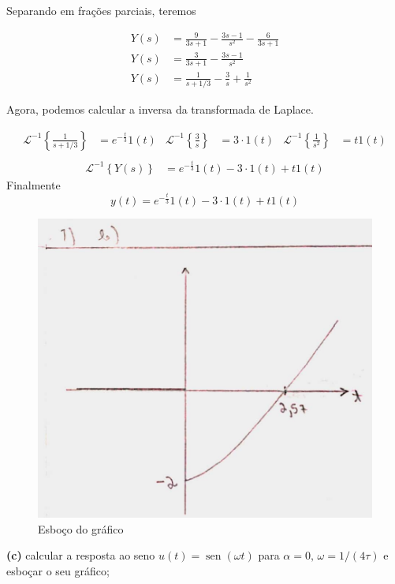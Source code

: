 \documentclass{article}
\DeclareMathOperator{\sen}{sen}
\begin{document}
Separando em frações parciais, teremos

\begin{align*}
    Y(s) &= \frac{9}{3s + 1} - \frac{3s - 1}{s^2} - \frac{6}{3s + 1}\\
    Y(s) &= \frac{3}{3s + 1} - \frac{3s - 1}{s^2}\\
    Y(s) &= \frac{1}{s + 1/3} - \frac{3}{s} + \frac{1}{s^2}
\end{align*}

Agora, podemos calcular a inversa da transformada de Laplace.

\begin{align*}
    \mathcal{L}^{-1} \left\{\frac{1}{s + 1/3}\right\} &= e^{-\frac{t}{3}}1(t) & \mathcal{L}^{-1} \left\{\frac{3}{s}\right\} &= 3\cdot1(t) & \mathcal{L}^{-1} \left\{\frac{1}{s^2}\right\} &= t1(t)\\
\end{align*}
\begin{align*}
    \mathcal{L}^{-1} \left\{Y(s)\right\} &= e^{-\frac{t}{3}}1(t) - 3\cdot1(t) + t1(t)
\end{align*}
Finalmente
\[y(t) = e^{-\frac{t}{3}}1(t) - 3\cdot1(t) + t1(t)\]

\begin{figure}[h]
    \includegraphics[scale=0.21]{Q1_b.png}
    \centering
    \caption{Esboço do gráfico}
\end{figure}

\textbf{(c)} calcular a resposta ao seno $u(t) = \sen(\omega t)$ para $\alpha = 0,\, \omega = 1/(4\tau)$ e esboçar o seu gráfico;
\end{document}
